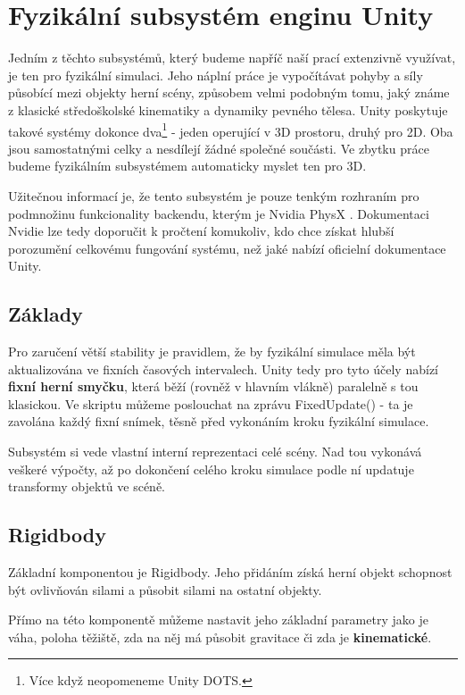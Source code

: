 \section{Fyzikální subsystém enginu Unity}

Jedním z těchto subsystémů, který budeme napříč naší prací extenzivně využívat, je ten pro fyzikální simulaci. Jeho náplní práce je vypočítávat pohyby a síly působící mezi objekty herní scény, způsobem velmi podobným tomu, jaký známe z klasické středoškolské kinematiky a dynamiky pevného tělesa. Unity poskytuje takové systémy dokonce dva\footnote{Více když neopomeneme Unity DOTS.} - jeden operující v 3D prostoru, druhý pro 2D. Oba jsou samostatnými celky a nesdílejí žádné společné součásti. Ve zbytku práce budeme fyzikálním subsystémem automaticky myslet ten pro 3D.   

Užitečnou informací je, že tento subsystém je pouze tenkým rozhraním pro podmnožinu funkcionality backendu, kterým je Nvidia PhysX \cite{PhysX}. Dokumentaci Nvidie \cite{PhysX} lze tedy doporučit k pročtení komukoliv, kdo chce získat hlubší porozumění celkovému fungování systému, než jaké nabízí oficielní dokumentace Unity.

\subsection{Základy}

Pro zaručení větší stability je pravidlem, že by fyzikální simulace měla být aktualizována ve fixních časových intervalech. Unity tedy pro tyto účely nabízí \textbf{fixní herní smyčku}, která běží (rovněž v hlavním vlákně) paralelně s tou klasickou. Ve skriptu můžeme poslouchat na zprávu FixedUpdate() - ta je zavolána každý fixní snímek, těsně před vykonáním kroku fyzikální simulace. 

Subsystém si vede vlastní interní reprezentaci celé scény. Nad tou vykonává veškeré výpočty, až po dokončení celého kroku simulace podle ní updatuje transformy objektů ve scéně. 

\subsection{Rigidbody}

Základní komponentou je Rigidbody. Jeho přidáním získá herní objekt schopnost být ovlivňován silami a působit silami na ostatní objekty.

Přímo na této komponentě můžeme nastavit jeho základní parametry jako je váha, poloha těžiště, zda na něj má působit gravitace či zda je \textbf{kinematické}.


